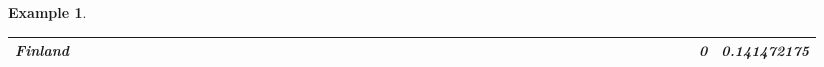 \documentclass[a4paper,11pt]{report}
\newtheorem{example}[theorem]{Example}
\begin{document}
\begin{example}
\begin{appendices}
\begin{landscape}
\begin{longtable}{r|r|r|r|r|r|r|r|r|r|r|r|r|r|r|r|r|r|r|r|r|r|r|r|r|r|r|r|r|r|r|r|r|r|r|r|r|r|r|r|r|r|r|r|r|r|r|}
\multicolumn{1}{|r|}{\textbf{Finland}}               &                                       &                                       &                                          &                                       &                                       &                                                     &                                        &                                       &                                      &                                       &                                       &                                                &                                       &                                      &                                       &                                       &                                      &                                       &                                       &                                       &                                      &                                     &                                      &                                         &                                     &                                       &                                          &                                      &                                        &                                       &                                      &                                          &                                      &                                        &                                        &                                     &                                      &                                           &                                               &                                      &                                       &                                              &                                      &                                     & 0                                             & 0.141472175                             \\ \hline

\end{longtable}
\end{landscape}
\end{appendices}
\end{example}
\end{document}
